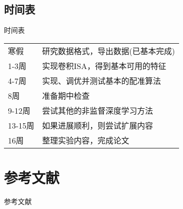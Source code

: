 \documentclass {beamer}
\begin{document}
\subsection{时间表}
\begin{frame}{时间表}
    \begin{tabular}{ll}
        寒假 & 研究数据格式，导出数据(已基本完成) \\
        1-3周 & 实现卷积ISA，得到基本可用的特征 \\
        4-7周 & 实现、调优并测试基本的配准算法 \\
        8周 & 准备期中检查 \\
        9-12周 & 尝试其他的非监督深度学习方法 \\
        13-15周 & 如果进展顺利，则尝试扩展内容 \\
        16周 & 整理实验内容，完成论文
    \end{tabular}
\end{frame}


\section{参考文献}
\begin{frame}[allowframebreaks]{参考文献}
    \printbibliography
\end{frame}


\section{ }
\subsection{ }
\end{document}
